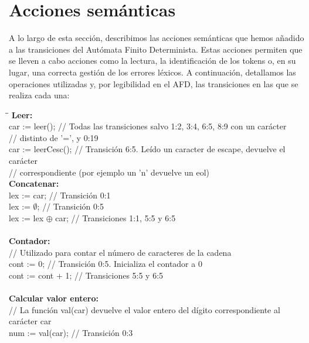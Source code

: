 \documentclass{article}
\begin{document}
\section{Acciones semánticas}
A lo largo de esta sección, describimos las acciones semánticas que hemos añadido a las transiciones del Autómata Finito Determinista. Estas acciones permiten que se lleven a cabo acciones como la lectura, la identificación de los tokens o, en su lugar, una correcta gestión de los errores léxicos. A continuación, detallamos las operaciones utilizadas y, por legibilidad en el AFD, las transiciones en las que se realiza cada una:\\
\begin{tabbing}
    \hspace{1cm}\=\hspace{5cm}\=\kill
    \textbf{Leer:} \\
    \> car := leer(); \> // Todas las transiciones salvo 1:2, 3:4, 6:5, 8:9 con un carácter\\
    \> \hspace{5cm}// distinto de '=', y 0:19\\
    \> car := leerCesc(); \> // Transición 6:5. Leído un caracter de escape, devuelve el carácter\\
    \> \hspace{5cm}// correspondiente (por ejemplo un 'n' devuelve un eol)
    \\
    \textbf{Concatenar:} \\
    \> lex := car; \> // Transición 0:1 \\
    \> lex := $\emptyset$; \> // Transición 0:5 \\
    \> lex := lex $\oplus$  car; \> // Transiciones 1:1, 5:5 y 6:5\\
    \\
    \textbf{Contador:} \\
    \> // Utilizado para contar el número de caracteres de la cadena \\
    \> cont := 0; \> // Transición 0:5. Inicializa el contador a 0\\
    \> cont := cont + 1; \> // Transiciones 5:5 y 6:5 \\
    \\
    \textbf{Calcular valor entero:} \\
    \> // La función val(car) devuelve el valor entero del dígito correspondiente al carácter car\\
    \> num := val(car); \> // Transición 0:3 \\

\end{tabbing}
\end{document}

